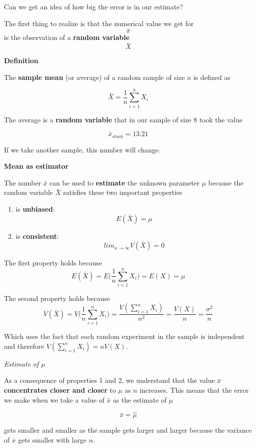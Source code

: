 \documentclass[
]{book}
\providecommand{\tightlist}{%
  \setlength{\itemsep}{0pt}\setlength{\parskip}{0pt}}
\begin{document}
Can we get an idea of how big the error is in our estimate?

The first thing to realize is that the numerical value we get for \[\bar{x}\] is the observation of a \textbf{random variable} \[\bar{X}\]

\textbf{Definition}

The \textbf{sample mean} (or average) of a random sample of size \(n\) is defined as

\[\bar{X}=\frac{1}{n}\sum_{i=1}^n X_i\]

The average is a \textbf{random variable} that in our sample of size \(8\) took the value

\[\bar{x}_{stock}=13.21\]

If we take another sample, this number will change.

\textbf{Mean as estimator}

The number \(\bar{x}\) can be used to \textbf{estimate} the unknown parameter \(\mu\) because the random variable \(\bar{X}\) satisfies these two important properties

\begin{enumerate}
\def\labelenumi{\arabic{enumi})}
\tightlist
\item
  is \textbf{unbiased}: \[E(\bar{X})=\mu\]
\item
  is \textbf{consistent}: \[lim_{n \rightarrow \infty} V(\bar{X}) = 0\]
\end{enumerate}

The first property holds because
\[E(\bar{X})=E\big(\frac{1}{n}\sum_{i=1}^n X_i\big)=E(X)=\mu\]

The second property holds because
\[V(\bar{X})=V\big(\frac{1}{n}\sum_{i=1}^n X_i\big)=\frac{V(\sum_{i=1}^ nX_i)}{n^2}=\frac{V(X)}{n}=\frac{\sigma^2}{n}\]

Which uses the fact that each random experiment in the sample is independent and therefore \(V(\sum_{i=1}^n X_i)=nV(X)\).

\emph{Estimate of \(\mu\)}

As a consequence of properties 1 and 2, we understand that the value \(\bar{x}\) \textbf{concentrates closer and closer} to \(\mu\) as \(n\) increases. This means that the error we make when we take a value of \(\bar{x}\) as the estimate of \(\mu\)

\[\bar{x}=\hat{\mu}\]

gets smaller and smaller as the sample gets larger and larger because the variance of \(\bar{x}\) gets smaller with large \(n\).
\end{document}
